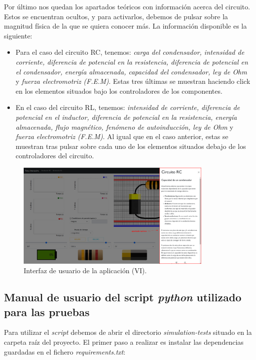 \documentclass[../main.tex]{subfiles}
\begin{document}
Por último nos quedan los apartados teóricos con información acerca del circuito. Estos se encuentran ocultos, y para activarlos, debemos de pulsar sobre la magnitud física de la que se quiera conocer más. La información disponible es la siguiente:

\begin{itemize}
  \item Para el caso del circuito RC, tenemos: \textit{carga del condensador, intensidad de corriente, diferencia de potencial en la resistencia, diferencia de potencial en el condensador, energía almacenada, capacidad del condensador, ley de Ohm} y \textit{fuerza electromotriz (F.E.M)}. Estas tres últimas se muestran haciendo click en los elementos situados bajo los controladores de los componentes.
  
  \item En el caso del circuito RL, tenemos: \textit{intensidad de corriente, diferencia de potencial en el inductor, diferencia de potencial en la resistencia, energía almacenada, flujo magnético, fenómeno de autoinducción, ley de Ohm} y \textit{fuerza electromotriz (F.E.M)}. Al igual que en el caso anterior, estas se muestran tras pulsar sobre cada uno de los elementos situados debajo de los controladores del circuito.
  
\end{itemize}


\begin{figure}[!ht]
  \centering
  \includegraphics[width=0.85\textwidth]{images/teorico.png}
  \caption{Interfaz de usuario de la aplicación (VI).}
  \label{fig::interfaz-usuario6}
\end{figure}


\subsection{Manual de usuario del script \textit{python} utilizado para las pruebas}
Para utilizar el \textit{script} debemos de  abrir el directorio \textit{simulation-tests} situado en la carpeta raíz del proyecto. El primer paso a realizar es instalar las dependencias guardadas en el fichero \textit{requirements.txt}:
\end{document}
